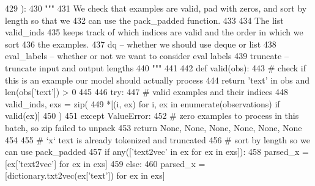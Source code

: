 \begin{DoxyCode}
429     ):
430         \textcolor{stringliteral}{"""}
431 \textcolor{stringliteral}{        We check that examples are valid, pad with zeros, and sort by length so that we}
432 \textcolor{stringliteral}{        can use the pack\_padded function.}
433 \textcolor{stringliteral}{}
434 \textcolor{stringliteral}{        The list valid\_inds}
435 \textcolor{stringliteral}{        keeps track of which indices are valid and the order in which we sort}
436 \textcolor{stringliteral}{        the examples.}
437 \textcolor{stringliteral}{        dq -- whether we should use deque or list}
438 \textcolor{stringliteral}{        eval\_labels -- whether or not we want to consider eval labels}
439 \textcolor{stringliteral}{        truncate -- truncate input and output lengths}
440 \textcolor{stringliteral}{        """}
441 
442         \textcolor{keyword}{def }valid(obs):
443             \textcolor{comment}{# check if this is an example our model should actually process}
444             \textcolor{keywordflow}{return} \textcolor{stringliteral}{'text'} \textcolor{keywordflow}{in} obs \textcolor{keywordflow}{and} len(obs[\textcolor{stringliteral}{'text'}]) > 0
445 
446         \textcolor{keywordflow}{try}:
447             \textcolor{comment}{# valid examples and their indices}
448             valid\_inds, exs = zip(
449                 *[(i, ex) \textcolor{keywordflow}{for} i, ex \textcolor{keywordflow}{in} enumerate(observations) \textcolor{keywordflow}{if} valid(ex)]
450             )
451         \textcolor{keywordflow}{except} ValueError:
452             \textcolor{comment}{# zero examples to process in this batch, so zip failed to unpack}
453             \textcolor{keywordflow}{return} \textcolor{keywordtype}{None}, \textcolor{keywordtype}{None}, \textcolor{keywordtype}{None}, \textcolor{keywordtype}{None}, \textcolor{keywordtype}{None}, \textcolor{keywordtype}{None}
454 
455         \textcolor{comment}{# `x` text is already tokenized and truncated}
456         \textcolor{comment}{# sort by length so we can use pack\_padded}
457         \textcolor{keywordflow}{if} any([\textcolor{stringliteral}{'text2vec'} \textcolor{keywordflow}{in} ex \textcolor{keywordflow}{for} ex \textcolor{keywordflow}{in} exs]):
458             parsed\_x = [ex[\textcolor{stringliteral}{'text2vec'}] \textcolor{keywordflow}{for} ex \textcolor{keywordflow}{in} exs]
459         \textcolor{keywordflow}{else}:
460             parsed\_x = [dictionary.txt2vec(ex[\textcolor{stringliteral}{'text'}]) \textcolor{keywordflow}{for} ex \textcolor{keywordflow}{in} exs]

\end{DoxyCode}
